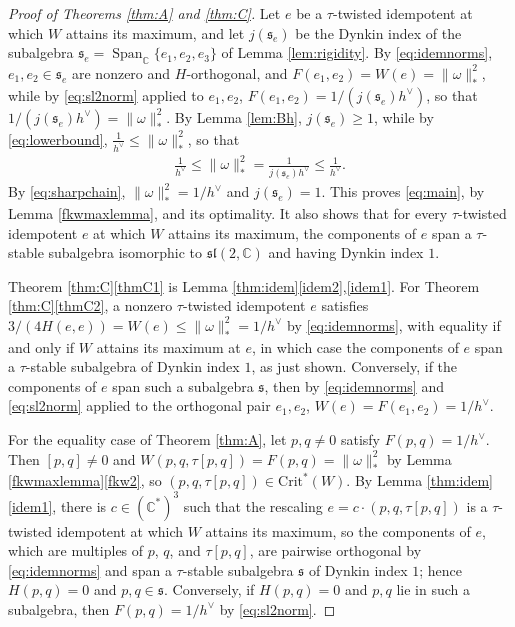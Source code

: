 \documentclass [leqno, 10pt]{amsart}
\theoremstyle{definition}
\numberwithin{equation}{section}
\newcommand{\om}{\omega}
\newcommand{\spn}{\operatorname{Span}}
\newcommand{\sll}{\mathfrak{sl}}
\newcommand{\com}{\mathbb C}
\newcommand{\crtnt}{\mathrm{Crit}^*}
\newcommand{\hv}{h^\vee}
\newcommand{\comass}[1]{\lVert #1\rVert_{\ast}}%
\newcommand{\subs}{\mathfrak{s}}
\begin{document}
\begin{proof}[Proof of Theorems \ref{thm:A} and \ref{thm:C}]
Let $e$ be a $\tau$-twisted idempotent at which $W$ attains its maximum, and let $j(\subs_{e})$ be the Dynkin index of the subalgebra $\subs_{e} = \spn_{\com}\{e_{1}, e_{2}, e_{3}\}$ of Lemma \ref{lem:rigidity}. By \eqref{eq:idemnorms}, $e_{1}, e_{2} \in \subs_{e}$ are nonzero and $H$-orthogonal, and $F(e_{1}, e_{2}) = W(e) = \comass{\om}^{2}$, while by \eqref{eq:sl2norm} applied to $e_{1}, e_{2}$, $F(e_{1}, e_{2}) = 1/(j(\subs_{e})\hv)$, so that $1/(j(\subs_{e})\hv) = \comass{\om}^{2}$. By Lemma \ref{lem:Bh}, $j(\subs_{e}) \geq 1$, while by  \eqref{eq:lowerbound}, $\frac{1}{\hv} \leq\comass{\om}^{2}$, so that
\begin{align}\label{eq:sharpchain}
\frac{1}{\hv} \leq \comass{\om}^{2} = \frac{1}{j(\subs_{e})\hv} \leq \frac{1}{\hv}.
\end{align}
By \eqref{eq:sharpchain}, $\comass{\om}^{2} = 1/\hv$ and $j(\subs_{e}) = 1$. This proves \eqref{eq:main}, by Lemma \ref{fkwmaxlemma}, and its optimality. It also shows that for every $\tau$-twisted idempotent $e$ at which $W$ attains its maximum, the components of $e$ span a $\tau$-stable subalgebra isomorphic to $\sll(2, \com)$ and having Dynkin index $1$.

Theorem \ref{thm:C}\ref{thmC1} is Lemma \ref{thm:idem}\ref{idem2},\ref{idem1}. For Theorem \ref{thm:C}\ref{thmC2}, a nonzero $\tau$-twisted idempotent $e$ satisfies $3/(4H(e, e)) = W(e) \leq \comass{\om}^{2} = 1/\hv$ by \eqref{eq:idemnorms}, with equality if and only if $W$ attains its maximum at $e$, in which case the components of $e$ span a $\tau$-stable subalgebra of Dynkin index $1$, as just shown. Conversely, if the components of $e$ span such a subalgebra $\subs$, then by \eqref{eq:idemnorms} and \eqref{eq:sl2norm} applied to the orthogonal pair $e_{1}, e_{2}$, $W(e) = F(e_{1}, e_{2}) = 1/\hv$.

For the equality case of Theorem \ref{thm:A}, let $p, q \neq 0$ satisfy $F(p, q) = 1/\hv$. Then $[p, q] \neq 0$ and $W(p, q, \tau[p, q]) = F(p, q) = \comass{\om}^{2}$ by Lemma \ref{fkwmaxlemma}\ref{fkw2}, so $(p, q, \tau[p, q]) \in \crtnt(W)$. By Lemma \ref{thm:idem}\ref{idem1}, there is $c \in (\com^{\ast})^{3}$ such that the rescaling $e = c \cdot (p, q, \tau[p, q])$ is a $\tau$-twisted idempotent at which $W$ attains its maximum, so the components of $e$, which are multiples of $p$, $q$, and $\tau[p, q]$, are pairwise orthogonal by \eqref{eq:idemnorms} and span a $\tau$-stable subalgebra $\subs$ of Dynkin index $1$; hence $H(p, q) = 0$ and $p, q \in \subs$. Conversely, if $H(p, q) = 0$ and $p, q$ lie in such a subalgebra, then $F(p, q) = 1/\hv$ by \eqref{eq:sl2norm}.
\end{proof}
\end{document}

